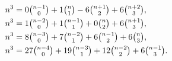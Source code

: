 \begin{align*}
  n^3
  &= 0 \tbinom{n-1}{0} + 1 \tbinom{n}{1} - 6 \tbinom{n+1}{2} + 6 \tbinom{n+2}{3}, \\
  n^3
  &= 1 \tbinom{n-2}{0} + 1 \tbinom{n-1}{1} + 0 \tbinom{n}{2} + 6 \tbinom{n+1}{3}, \\
  n^3
  &= 8 \tbinom{n-3}{0} + 7 \tbinom{n-2}{1} + 6 \tbinom{n-1}{2} + 6 \tbinom{n}{3}, \\
  n^3
  &= 27 \tbinom{n-4}{0} + 19 \tbinom{n-3}{1} + 12 \tbinom{n-2}{2} + 6 \tbinom{n-1}{3}.
\end{align*}

